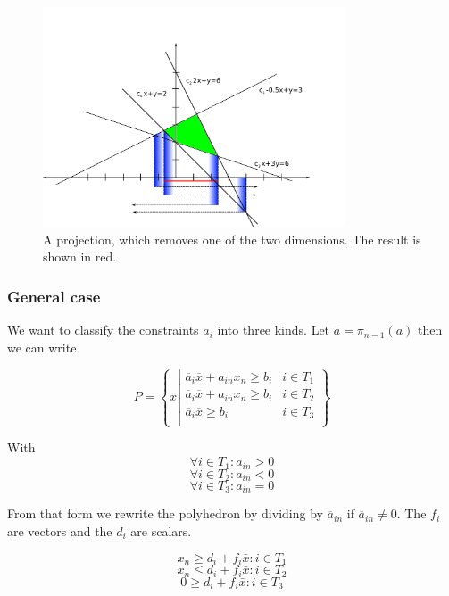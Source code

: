 \begin{figure}[hbt]
\begin{center}
\includegraphics[width=0.8\textwidth]{./images/motzkin.pdf} %
\end{center}
\caption{A projection, which removes one of the two dimensions. The result is shown in red.}
\label{Fig:motzkinExample}
\end{figure}

\subsubsection*{General case}
We want to classify the constraints $a_i$ into three kinds. Let $\overline a = \pi_{n-1}(a)$ then we can write  

\[P=\left\{x\left| \begin{array}{cr}
\overline a_i\overline x +a_{in}x_n \geq b_i & i\in T_1\\
\overline a_i\overline x +a_{in}x_n \geq b_i & i\in T_2\\
\overline a_i\overline x \geq b_i & i\in T_3\\
\end{array}\right.\right\}\]

With 
$$\forall i\in T_1: a_{in}>0$$ $$\forall i\in T_2: a_{in}<0$$ $$ \forall i\in T_3: a_{in}=0 $$

From that form we rewrite the polyhedron by dividing by $\overline a_{in}$ if $\overline a_{in}\neq 0$. The $f_i$ are vectors and the $d_i$ are scalars. 

\begin{equation}\label{For:Motz1}x_n \geq  d_i + f_i \bar x : i \in T_1 \end{equation}
\begin{equation}\label{For:Motz2}x_n \leq  d_i+f_i \bar x : i \in T_2 \end{equation}
\begin{equation}\label{For:Motz3}0 \geq  d_i+f_i \bar x : i \in T_3 \end{equation}

